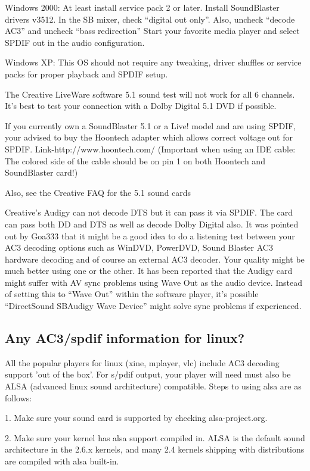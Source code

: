 ﻿\documentclass[12pt]{article}
\begin{document}
Windows 2000: At least install service pack 2 or later. Install SoundBlaster drivers v3512. In the
SB mixer, check ``digital out only''. Also, uncheck ``decode AC3'' and uncheck ``bass redirection''
Start your favorite media player and select SPDIF out in the audio configuration.

Windows XP: This OS should not require any tweaking, driver shuffles or service packs for proper
playback and SPDIF setup.

The Creative LiveWare software 5.1 sound test will not work for all 6 channels. It's best to test
your connection with a Dolby Digital 5.1 DVD if possible.

If you currently own a SoundBlaster 5.1 or a Live! model and are using SPDIF, your advised to buy
the Hoontech adapter which allows correct voltage out for SPDIF. Link-http://www.hoontech.com/
(Important when using an IDE cable: The colored side of the cable should be on pin 1 on both
Hoontech and SoundBlaster card!)

Also, see the Creative FAQ for the 5.1 sound cards

Creative's Audigy can not decode DTS but it can pass it via SPDIF. The card can pass both DD and
DTS as well as decode Dolby Digital also. It was pointed out by Goa333 that it might be a good idea
to do a listening test between your AC3 decoding options such as WinDVD, PowerDVD, Sound Blaster AC3
hardware decoding and of course an external AC3 decoder. Your quality might be much better using one
or the other. It has been reported that the Audigy card might suffer with AV sync problems using
Wave Out as the audio device. Instead of setting this to ``Wave Out'' within the software player,
it's possible ``DirectSound SBAudigy Wave Device'' might solve sync problems if experienced.

\subsection{Any AC3/spdif information for linux?}

All the popular players for linux (xine, mplayer, vlc) include AC3 decoding support 'out of the
box'. For s/pdif output, your player will need must also be ALSA (advanced linux sound architecture)
compatible. Steps to using alsa are as follows:

1. Make sure your sound card is supported by checking alsa-project.org.

2. Make sure your kernel has alsa support compiled in. ALSA is the default sound architecture in the
2.6.x kernels, and many 2.4 kernels shipping with distributions are compiled with alsa built-in.
\end{document}
